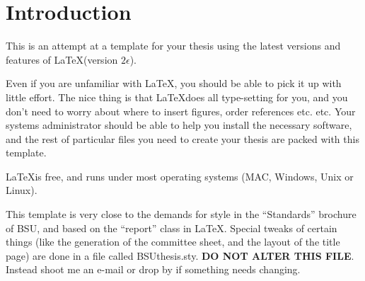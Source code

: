 \chapter{Introduction}

This is an attempt at a template for your thesis using the latest
versions and features of \LaTeX (version $2\epsilon$).  

Even if you are unfamiliar with \LaTeX, you should be able to pick it
up with little effort. The nice thing is that \LaTeX does all
type-setting for you, and you don't need to worry about where to
insert figures, order references etc. etc. Your systems administrator
should be able to help you install the necessary software, and the
rest of particular files you need to create your thesis are packed
with this template.

\LaTeX is free, and runs under most operating systems (MAC, Windows,
Unix or Linux).

This template is very close to the demands for style in the
``Standards'' brochure of BSU, and based on the ``report'' class in
\LaTeX. Special tweaks of certain things (like the generation of the
committee sheet, and the layout of the title page) are done in a file
called BSUthesis.sty. {\bf DO NOT ALTER THIS FILE}.  Instead shoot me
an e-mail or drop by if something needs changing.



